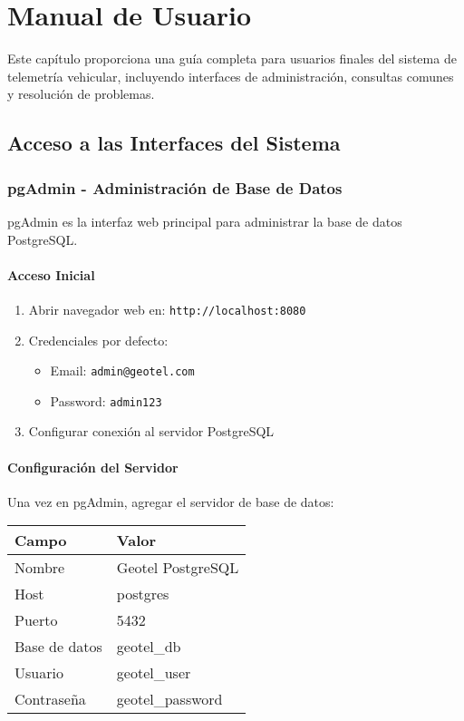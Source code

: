 \chapter{Manual de Usuario}
\label{chap:manual}

Este capítulo proporciona una guía completa para usuarios finales del sistema de telemetría vehicular, incluyendo interfaces de administración, consultas comunes y resolución de problemas.

\section{Acceso a las Interfaces del Sistema}

\subsection{pgAdmin - Administración de Base de Datos}

pgAdmin es la interfaz web principal para administrar la base de datos PostgreSQL.

\subsubsection{Acceso Inicial}
\begin{enumerate}[noitemsep]
    \item Abrir navegador web en: \texttt{http://localhost:8080}
    \item Credenciales por defecto:
    \begin{itemize}
        \item Email: \texttt{admin@geotel.com}
        \item Password: \texttt{admin123}
    \end{itemize}
    \item Configurar conexión al servidor PostgreSQL
\end{enumerate}

\subsubsection{Configuración del Servidor}
Una vez en pgAdmin, agregar el servidor de base de datos:

\begin{table}[H]
\centering
\begin{tabular}{|l|l|}
\hline
\textbf{Campo} & \textbf{Valor} \\
\hline
Nombre & Geotel PostgreSQL \\
\hline
Host & postgres \\
\hline
Puerto & 5432 \\
\hline
Base de datos & geotel\_db \\
\hline
Usuario & geotel\_user \\
\hline
Contraseña & geotel\_password \\
\hline
\end{tabular}
\end{table}


